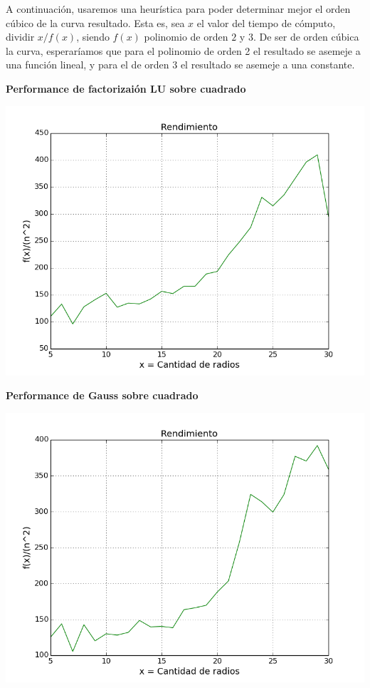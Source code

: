 A continuaci\'on, usaremos una heur\'istica para poder determinar mejor el orden c\'ubico de la curva resultado. Esta es, sea $x$ el valor del tiempo de c\'omputo, dividir $x/f(x)$, siendo $f(x)$ polinomio de orden $2$ y $3$. De ser de orden c\'ubica la curva, esperar\'iamos que para el polinomio de orden 2 el resultado se asemeje a una funci\'on lineal, y para el de orden 3 el resultado se asemeje a una constante.

  	\textbf{Performance de factorizai\'on LU sobre cuadrado}\\

\begin{center}
\includegraphics[scale=0.65]{experimentos2a_2b/Lucuadrado.png}
\end{center}

  	\textbf{Performance de Gauss sobre cuadrado}\\

\begin{center}
\includegraphics[scale=0.65]{experimentos2a_2b/GaussCuadrado.png}
\end{center}

